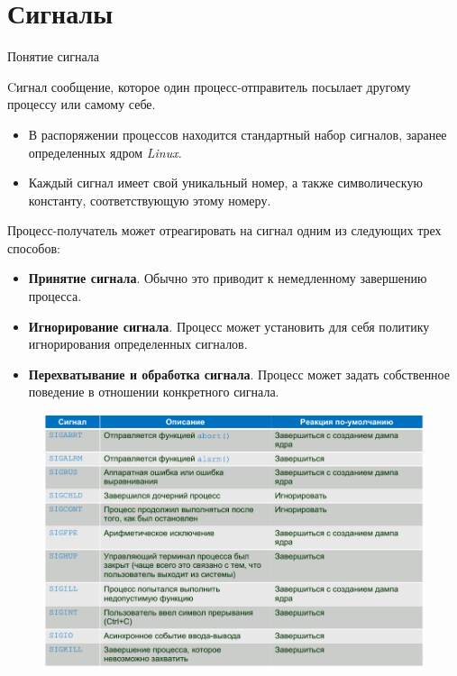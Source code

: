 \documentclass[xcolor=table]{beamer}
\begin{document}
\section{Сигналы}

\begin{frame}{Понятие сигнала}
	\begin{block}{Cигнал}
		сообщение, которое один процесс-отправитель посылает другому процессу или самому себе.
	\end{block}
	\begin{itemize}
		\item В распоряжении процессов находится стандартный набор сигналов, заранее определенных ядром \textit{Linux}.
		\item Каждый сигнал имеет свой уникальный номер, а также символическую константу, соответствующую этому номеру. 
	\end{itemize}
	Процесс-получатель может отреагировать на сигнал одним из следующих трех способов:
	\begin{itemize}
		\item \textbf{Принятие сигнала}. Обычно это приводит к немедленному завершению процесса.
		\item \textbf{Игнорирование сигнала}. Процесс может установить для себя политику игнорирования определенных сигналов. 
		\item \textbf{Перехватывание и обработка сигнала}. Процесс может задать собственное поведение в отношении конкретного сигнала.
	\end{itemize}
\end{frame}

\begin{frame}[fragile]
	\begin{figure}[h]
		\centering
		\includegraphics[scale=0.5]{images/signals.png}
	\end{figure}
\end{frame}
\end{document}
